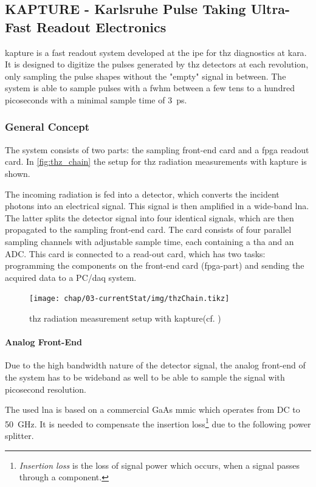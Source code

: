 \subsection{KAPTURE - Karlsruhe Pulse Taking Ultra-Fast Readout Electronics}
\Gls{kapture} is a fast readout system developed at the \Gls{ipe} for \Gls{thz} diagnostics at \gls{kara}. It is designed to digitize the pulses generated by \Gls{thz} detectors at each revolution, only sampling the pulse shapes without the "empty" signal in between. The system is able to sample pulses with a \gls{fwhm} between a few tens to a hundred picoseconds with a minimal sample time of \SI{3}{\pico \second}. \cite{caselleKAP}

\subsubsection*{General Concept}
The system consists of two parts: the sampling front-end card and a \gls{fpga} readout card. In \autoref{fig:thz_chain} the setup for \gls{thz} radiation measurements with \gls{kapture} is shown. 

The incoming radiation is fed into a detector, which converts the incident photons into an electrical signal. This signal is then amplified in a wide-band \gls{lna}. The latter splits the detector signal into four identical signals, which are then propagated to the sampling front-end card. The card consists of four parallel sampling channels with adjustable sample time, each containing a \gls{tha} and an ADC. This card is connected to a read-out card, which has two tasks: programming the components on the front-end card (\gls{fpga}-part) and sending the acquired data to a PC/\gls{daq} system. \cite{caselle2014}

\begin{figure}[tbh]
	\centering
	\texttt{[image: chap/03-currentStat/img/thzChain.tikz]}
	\caption[THz measurement with KAPTURE]{\gls{thz} radiation measurement setup with \gls{kapture}(cf. \cite{caselle2014})}
	\label{fig:thz_chain}
\end{figure}

\paragraph{Analog Front-End}
Due to the high bandwidth nature of the detector signal, the analog front-end of the system has to be wideband as well to be able to sample the signal with picosecond resolution. 

The used \gls{lna} is based on a commercial GaAs \gls{mmic} which operates from DC to \SI{50}{\giga \hertz}. It is needed to compensate the insertion loss\footnote{\textit{Insertion loss} is the loss of signal power which occurs, when a signal passes through a component.} due to the following power splitter. 

